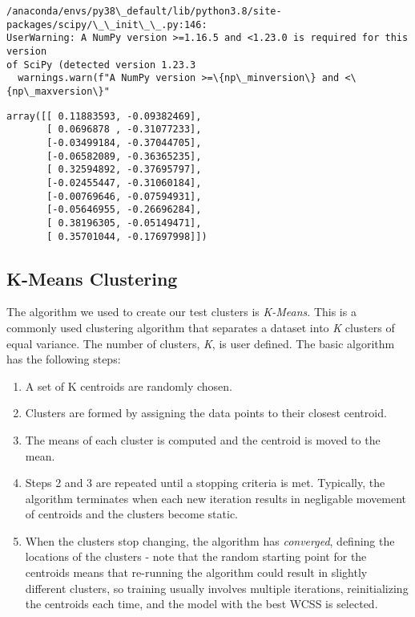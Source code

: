 \documentclass[11pt]{article}
\makeatletter
\providecommand{\tightlist}{%
      \setlength{\itemsep}{0pt}\setlength{\parskip}{0pt}}
\newcommand{\boxspacing}{\kern\kvtcb@left@rule\kern\kvtcb@boxsep}
\newcommand{\prompt}[4]{
        {\ttfamily\llap{{\color{#2}[#3]:\hspace{3pt}#4}}\vspace{-\baselineskip}}
    }
\makeatother
\begin{document}
    \begin{Verbatim}[commandchars=\\\{\}]
/anaconda/envs/py38\_default/lib/python3.8/site-packages/scipy/\_\_init\_\_.py:146:
UserWarning: A NumPy version >=1.16.5 and <1.23.0 is required for this version
of SciPy (detected version 1.23.3
  warnings.warn(f"A NumPy version >=\{np\_minversion\} and <\{np\_maxversion\}"
    \end{Verbatim}

            \begin{tcolorbox}[breakable, size=fbox, boxrule=.5pt, pad at break*=1mm, opacityfill=0]
\prompt{Out}{outcolor}{1}{\boxspacing}
\begin{Verbatim}[commandchars=\\\{\}]
array([[ 0.11883593, -0.09382469],
       [ 0.0696878 , -0.31077233],
       [-0.03499184, -0.37044705],
       [-0.06582089, -0.36365235],
       [ 0.32594892, -0.37695797],
       [-0.02455447, -0.31060184],
       [-0.00769646, -0.07594931],
       [-0.05646955, -0.26696284],
       [ 0.38196305, -0.05149471],
       [ 0.35701044, -0.17697998]])
\end{Verbatim}
\end{tcolorbox}
        
    \hypertarget{k-means-clustering}{%
\subsection{K-Means Clustering}\label{k-means-clustering}}

The algorithm we used to create our test clusters is \emph{K-Means}.
This is a commonly used clustering algorithm that separates a dataset
into \emph{K} clusters of equal variance. The number of clusters,
\emph{K}, is user defined. The basic algorithm has the following steps:

\begin{enumerate}
\def\labelenumi{\arabic{enumi}.}
\tightlist
\item
  A set of K centroids are randomly chosen.
\item
  Clusters are formed by assigning the data points to their closest
  centroid.
\item
  The means of each cluster is computed and the centroid is moved to the
  mean.
\item
  Steps 2 and 3 are repeated until a stopping criteria is met.
  Typically, the algorithm terminates when each new iteration results in
  negligable movement of centroids and the clusters become static.
\item
  When the clusters stop changing, the algorithm has \emph{converged},
  defining the locations of the clusters - note that the random starting
  point for the centroids means that re-running the algorithm could
  result in slightly different clusters, so training usually involves
  multiple iterations, reinitializing the centroids each time, and the
  model with the best WCSS is selected.
\end{enumerate}
\end{document}
